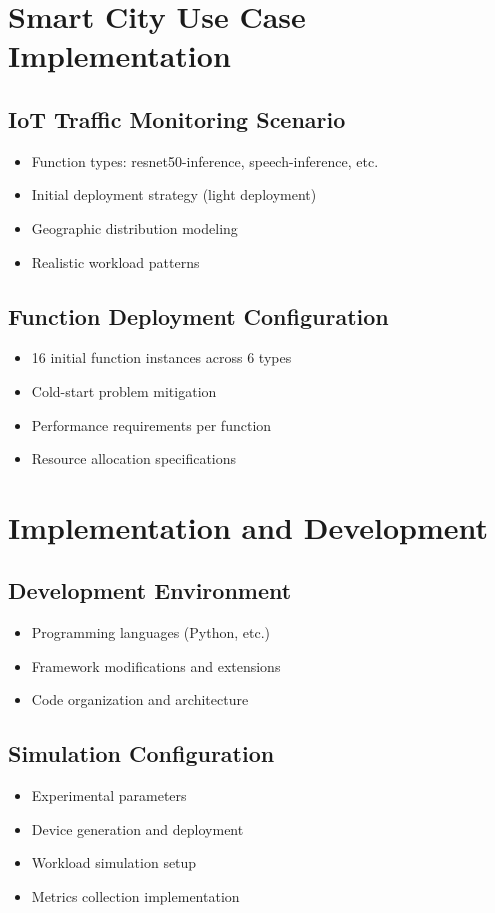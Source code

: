 \documentclass[12pt,a4paper]{report}
\begin{document}
\section{Smart City Use Case Implementation}

\subsection{IoT Traffic Monitoring Scenario}
\begin{itemize}[leftmargin=1cm]
    \item Function types: resnet50-inference, speech-inference, etc.
    \item Initial deployment strategy (light deployment)
    \item Geographic distribution modeling
    \item Realistic workload patterns
\end{itemize}

\subsection{Function Deployment Configuration}
\begin{itemize}[leftmargin=1cm]
    \item 16 initial function instances across 6 types
    \item Cold-start problem mitigation
    \item Performance requirements per function
    \item Resource allocation specifications
\end{itemize}

\section{Implementation and Development}

\subsection{Development Environment}
\begin{itemize}[leftmargin=1cm]
    \item Programming languages (Python, etc.)
    \item Framework modifications and extensions
    \item Code organization and architecture
\end{itemize}

\subsection{Simulation Configuration}
\begin{itemize}[leftmargin=1cm]
    \item Experimental parameters
    \item Device generation and deployment
    \item Workload simulation setup
    \item Metrics collection implementation
\end{itemize}
\end{document}
